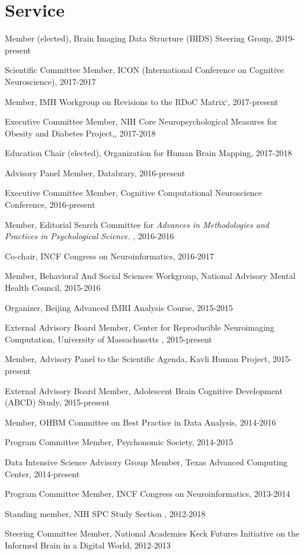 \section*{Service}
\noindent

Member (elected), Brain Imaging Data Structure (BIDS) Steering Group, 2019-present 

Scientific Committee Member, ICON (International Conference on Cognitive Neuroscience), 2017-2017 

Member, IMH Workgroup on Revisions to the RDoC Matrix`, 2017-present 

Executive Committee Member, NIH Core Neuropsychological Measures for Obesity and Diabetes Project,, 2017-2018 

Education Chair (elected), Organization for Human Brain Mapping, 2017-2018 

Advisory Panel Member, Databrary, 2016-present 

Executive Committee Member, Cognitive Computational Neuroscience Conference, 2016-present 

Member, Editorial Search Committee for \emph{Advances in Methodologies and Practices in Psychological Science.} , 2016-2016 

Co-chair, INCF Congress on Neuroinformatics, 2016-2017 

Member, Behavioral And Social Sciences Workgroup, National Advisory Mental Health Council, 2015-2016 

Organizer, Beijing Advanced fMRI Analysis Course, 2015-2015 

External Advisory Board Member, Center for Reproducible Neuroimaging Computation, University of Massachusetts , 2015-present 

Member, Advisory Panel to the Scientific Agenda, Kavli Human Project, 2015-present 

External Advisory Board Member, Adolescent Brain Cognitive Development (ABCD) Study, 2015-present 

Member, OHBM Committee on Best Practice in Data Analysis, 2014-2016 

Program Committee Member, Psychonomic Society, 2014-2015 

Data Intensive Science Advisory Group Member, Texas Advanced Computing Center, 2014-present 

Program Committee Member, INCF Congress on Neuroinformatics, 2013-2014 

Standing member, NIH SPC Study Section , 2012-2018 

Steering Committee Member, National Academies Keck Futures Initiative on the Informed Brain in a Digital World, 2012-2013 


